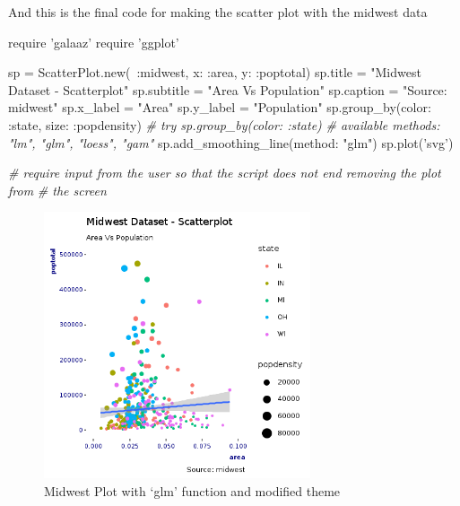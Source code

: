 \documentclass[]{article}
\newenvironment{Shaded}{\begin{snugshade}}{\end{snugshade}}
\newcommand{\DataTypeTok}[1]{\textcolor[rgb]{0.13,0.29,0.53}{#1}}
\newcommand{\StringTok}[1]{\textcolor[rgb]{0.31,0.60,0.02}{#1}}
\newcommand{\CommentTok}[1]{\textcolor[rgb]{0.56,0.35,0.01}{\textit{#1}}}
\newcommand{\NormalTok}[1]{#1}
\begin{document}
And this is the final code for making the scatter plot with the midwest
data

\begin{Shaded}
\begin{Highlighting}[]
\NormalTok{require }\StringTok{'galaaz'}
\NormalTok{require }\StringTok{'ggplot'}

\NormalTok{sp = }\DataTypeTok{ScatterPlot}\NormalTok{.new(~}\StringTok{:midwest}\NormalTok{, }\StringTok{x: :area}\NormalTok{, }\StringTok{y: :poptotal}\NormalTok{)}
\NormalTok{sp.title = }\StringTok{"Midwest Dataset - Scatterplot"}
\NormalTok{sp.subtitle = }\StringTok{"Area Vs Population"}
\NormalTok{sp.caption = }\StringTok{"Source: midwest"}
\NormalTok{sp.x_label = }\StringTok{"Area"}
\NormalTok{sp.y_label = }\StringTok{"Population"}
\NormalTok{sp.group_by(}\StringTok{color: :state}\NormalTok{, }\StringTok{size: :popdensity}\NormalTok{)    }\CommentTok{# try sp.group_by(color: :state)}
\CommentTok{# available methods: "lm", "glm", "loess", "gam"}
\NormalTok{sp.add_smoothing_line(}\StringTok{method: "glm"}\NormalTok{) }
\NormalTok{sp.plot(}\StringTok{'svg'}\NormalTok{)}

\CommentTok{# require input from the user so that the script does not end removing the plot from}
\CommentTok{# the screen}
\end{Highlighting}
\end{Shaded}

\begin{figure}
\centering
\includegraphics[width=0.70000\textwidth]{scatter_plot.png}
\caption{Midwest Plot with `glm' function and modified theme}
\end{figure}
\end{document}

